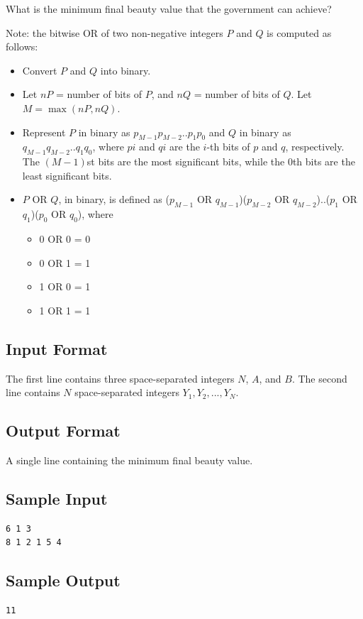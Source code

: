 \documentclass[a4paper]{article}
\begin{document}
What is the minimum final beauty value that the government can achieve?

Note: the bitwise OR of two non-negative integers $P$ and $Q$ is computed as follows:

\begin{itemize} \itemsep1pt \parskip0pt
\item Convert $P$ and $Q$ into binary.
\item Let $nP$ = number of bits of $P$, and $nQ$ = number of bits of $Q$. Let $M = \max(nP, nQ)$.
\item Represent $P$ in binary as $p_{M-1}p_{M-2} .. p_1p_0$ and $Q$ in binary as $q_{M-1}q_{M-2} .. q_1q_0$, where $pi$ and $qi$ are the $i$-th bits of $p$ and $q$, respectively. The $(M-1)$st bits are the most significant bits, while the $0$th bits are the least significant bits.
\item $P$ OR $Q$, in binary, is defined as ($p_{M-1}$ OR $q_{M-1}$)($p_{M-2}$ OR $q_{M-2}$)..($p_1$ OR $q_1$)($p_0$ OR $q_0$), where
\begin{itemize} \itemsep1pt \parskip0pt
\item 0 OR 0 = 0
\item 0 OR 1 = 1
\item 1 OR 0 = 1
\item 1 OR 1 = 1
\end{itemize}
\end{itemize}

\subsection*{Input Format}
The first line contains three space-separated integers $N$, $A$, and $B$. The second line contains $N$ space-separated integers $Y_1, Y_2, ..., Y_N$.

\subsection*{Output Format}
A single line containing the minimum final beauty value.

\subsection*{Sample Input}
\begin{verbatim}
6 1 3
8 1 2 1 5 4
\end{verbatim}

\subsection*{Sample Output}
\begin{verbatim}
11
\end{verbatim}
\end{document}
